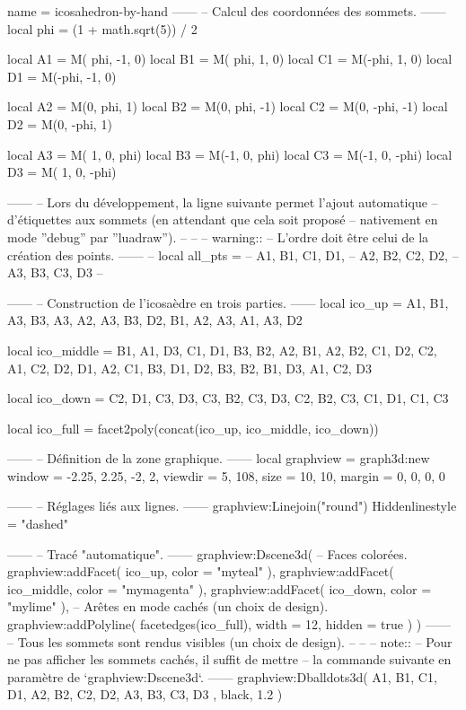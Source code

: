 \documentclass[border = 3pt]{standalone}
\begin{document}
\begin{luadraw}{name = icosahedron-by-hand}
------
-- Calcul des coordonnées des sommets.
------
local phi = (1 + math.sqrt(5)) / 2

local A1 = M( phi, -1, 0)
local B1 = M( phi,  1, 0)
local C1 = M(-phi,  1, 0)
local D1 = M(-phi, -1, 0)

local A2 = M(0,  phi,  1)
local B2 = M(0,  phi, -1)
local C2 = M(0, -phi, -1)
local D2 = M(0, -phi,  1)

local A3 = M( 1, 0,  phi)
local B3 = M(-1, 0,  phi)
local C3 = M(-1, 0, -phi)
local D3 = M( 1, 0, -phi)

------
-- Lors du développement, la ligne suivante permet l'ajout automatique
-- d'étiquettes aux sommets (en attendant que cela soit proposé
-- nativement en mode ''debug'' par ''luadraw'').
--
--
--  warning::
--      L'ordre doit être celui de la création des points.
------
-- local all_pts = {
--   A1, B1, C1, D1,
--   A2, B2, C2, D2,
--   A3, B3, C3, D3
-- }

------
-- Construction de l'icosaèdre en trois parties.
------
local ico_up = {
  {A1, B1, A3},
  {B3, A3, A2},
  {A3, B3, D2},
  {B1, A2, A3},
  {A1, A3, D2}
}

local ico_middle = {
  {B1, A1, D3},
  {C1, D1, B3},
  {B2, A2, B1},
  {A2, B2, C1},
  {D2, C2, A1},
  {C2, D2, D1},
  {A2, C1, B3},
  {D1, D2, B3},
  {B2, B1, D3},
  {A1, C2, D3}
}

local ico_down = {
  {C2, D1, C3},
  {D3, C3, B2},
  {C3, D3, C2},
  {B2, C3, C1},
  {D1, C1, C3}
}

local ico_full = facet2poly(concat(ico_up, ico_middle, ico_down))

------
-- Définition de la zone graphique.
------
local graphview = graph3d:new{
    window  = {-2.25, 2.25, -2, 2},
    viewdir = {5, 108},
    size    = {10, 10},
    margin  = {0, 0, 0, 0}
}

------
-- Réglages liés aux lignes.
------
graphview:Linejoin("round")
Hiddenlinestyle = "dashed"

------
-- Tracé "automatique".
------
graphview:Dscene3d(
-- Faces colorées.
    graphview:addFacet(
      ico_up,
      {
        color = "myteal"
      }),
    graphview:addFacet(
      ico_middle,
      {
        color = "mymagenta"
      }),
    graphview:addFacet(
      ico_down,
      {
        color = "mylime"
      }),
-- Arêtes en mode cachés (un choix de design).
    graphview:addPolyline(
      facetedges(ico_full),
      {
        width = 12,
        hidden = true
      })
)
------
-- Tous les sommets sont rendus visibles (un choix de design).
--
--
-- note::
--     Pour ne pas afficher les sommets cachés, il suffit de mettre
--     la commande suivante en paramètre de `graphview:Dscene3d`.
------
graphview:Dballdots3d(
  {
    A1, B1, C1, D1,
    A2, B2, C2, D2,
    A3, B3, C3, D3
  },
  black,
  1.2
)


\end{luadraw}
\end{document}
